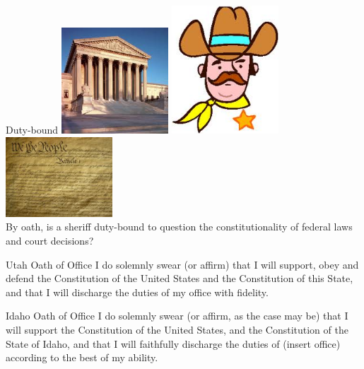\begin{frame}{Duty-bound}
    \centering
    \includegraphics[width=0.3\textwidth]{img/court-bldg.png}
    \includegraphics[width=0.3\textwidth]{img/sheriff-clip.png}
    \includegraphics[width=0.3\textwidth]{img/constitution.png} \\
    \vspace{18pt}
    By oath, is a sheriff duty-bound to question the constitutionality of federal laws and court decisions? \\
\end{frame}

\begin{frame}
    \begin{block}{Utah Oath of Office}
    I do solemnly swear (or affirm) that I will support, obey and defend the Constitution of the United States and the Constitution of this State, and that I will discharge the duties of my office with fidelity.
    \end{block}
\end{frame}

\begin{frame}
    \begin{block}{Idaho Oath of Office}
    I do solemnly swear (or affirm, as the case may be) that I will support the Constitution of the United States, and the Constitution of the State of Idaho, and that I will faithfully discharge the duties of (insert office) according to the best of my ability.
    \end{block}
\end{frame}


